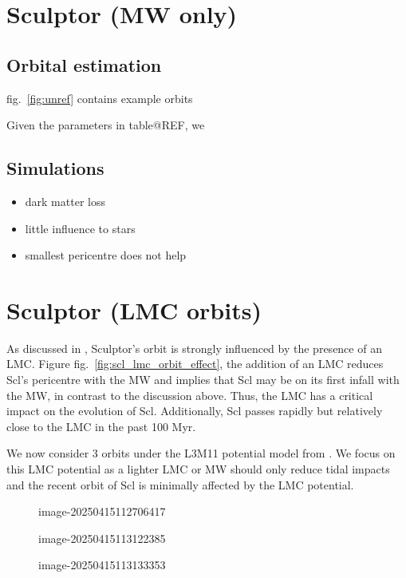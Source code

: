 \section{Sculptor (MW only)}\label{sculptor-mw-only}

\subsection{Orbital estimation}\label{orbital-estimation}

fig.~\ref{fig:unref} contains example orbits

Given the parameters in table@REF, we

\subsection{Simulations}\label{simulations}

\begin{itemize}
\tightlist
\item
  dark matter loss
\item
  little influence to stars
\item
  smallest pericentre does not help
\end{itemize}

\section{Sculptor (LMC orbits)}\label{sculptor-lmc-orbits}

As discussed in \citet{battaglia+2022}, Sculptor's orbit is strongly
influenced by the presence of an LMC. Figure
fig.~\ref{fig:scl_lmc_orbit_effect}, the addition of an LMC reduces
Scl's pericentre with the MW and implies that Scl may be on its first
infall with the MW, in contrast to the discussion above. Thus, the LMC
has a critical impact on the evolution of Scl. Additionally, Scl passes
rapidly but relatively close to the LMC in the past 100 Myr.

We now consider 3 orbits under the L3M11 potential model from
\citet{vasiliev2024}. We focus on this LMC potential as a lighter LMC or
MW should only reduce tidal impacts and the recent orbit of Scl is
minimally affected by the LMC potential.

\begin{figure}
\centering
{}
\caption{image-20250415112706417}
\end{figure}

\begin{figure}
\centering
{}
\caption{image-20250415113122385}
\end{figure}

\begin{figure}
\centering
{}
\caption{image-20250415113133353}
\end{figure}
